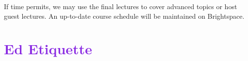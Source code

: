 \documentclass[letterpaper,11pt]{article}
\begin{document}

If time permits, we may use the final lectures to cover advanced
topics or host guest lectures. An up-to-date course schedule will be
maintained on Brightspace.

\section*{\textcolor{BlueViolet}{Ed Etiquette}}
\end{document}
